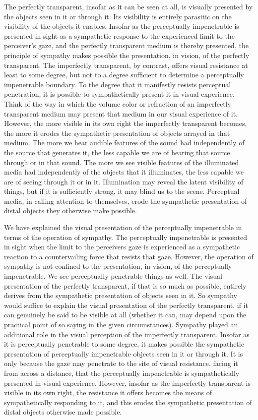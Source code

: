 The perfectly transparent, insofar as it can be seen at all, is visually presented by the objects seen in it or through it. Its visibility is entirely parasitic on the visibility of the objects it enables. Insofar as the perceptually impenetrable is presented in sight as a sympathetic response to the experienced limit to the perceiver's gaze, and the perfectly transparent medium is thereby presented, the principle of sympathy makes possible the presentation, in vision, of the perfectly transparent. The imperfectly transparent, by contrast, offers visual resistance at least to some degree, but not to a degree sufficient to determine a perceptually impenetrable boundary. To the degree that it manifestly resists perceptual penetration, it is possible to sympathetically present it in visual experience. Think of the way in which the volume color or refraction of an imperfectly transparent medium may present that medium in our visual experience of it. However, the more visible in its own right the imperfectly transparent becomes, the more it erodes the sympathetic presentation of objects arrayed in that medium. The more we hear audible features of the sound had independently of the source that generates it, the less capable we are of hearing that source through or in that sound. The more we see visible features of the illuminated media had independently of the objects that it illuminates, the less capable we are of seeing through it or in it. Illumination may reveal the latent visibility of things, but if it is sufficiently strong, it may blind us to the scene. Perceptual media, in calling attention to themselves, erode the sympathetic presentation of distal objects they otherwise make possible.

We have explained the visual presentation of the perceptually impenetrable in terms of the operation of sympathy. The perceptually impenetrable is presented in sight when the limit to the perceivers gaze is experienced as a sympathetic reaction to a countervailing force that resists that gaze. However, the operation of sympathy is not confined to the presentation, in vision, of the perceptually impenetrable. We see perceptually penetrable things as well. The visual presentation of the perfectly transparent, if that is so much as possible, entirely derives from the sympathetic presentation of objects seen in it. So sympathy would suffice to explain the visual presentation of the perfectly transparent, if it can genuinely be said to be visible at all (whether it can, may depend upon the practical point of so saying in the given circumstances). Sympathy played an additional role in the visual perception of the imperfectly transparent. Insofar as it is perceptually penetrable to some degree, it makes possible the sympathetic presentation of perceptually impenetrable objects seen in it or through it. It is only because the gaze may penetrate to the site of visual resistance, facing it from across a distance, that the perceptually impenetrable is sympathetically presented in visual experience. However, insofar as the imperfectly transparent is visible in its own right, the resistance it offers becomes the means of sympathetically responding to it, and this erodes the sympathetic presentation of distal objects otherwise made possible. 

